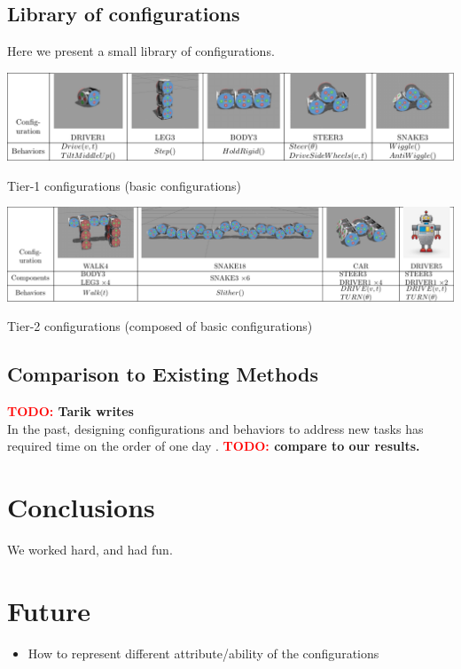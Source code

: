 \documentclass[conference]{IEEEtran}
\theoremstyle{definition}
\newcommand{\TODO}[1]{ {\bf \textcolor{red}{TODO:} #1 }}
\begin{document}
\subsection{Library of configurations}
Here we present a small library of configurations.
\begin{table}
    \begin{center}
        \includegraphics{images/library/tier1.pdf}
        \caption{Tier-1 configurations (basic configurations)}
    \end{center}
\end{table}
\begin{table}
    \begin{center}
        \includegraphics{images/library/tier2.pdf}
        \caption{Tier-2 configurations (composed of basic configurations)}
    \end{center}
\end{table}

\subsection{Comparison to Existing Methods}
\TODO{Tarik writes}\\
In the past, designing configurations and behaviors to address new tasks has required
time on the order of one day \cite{sastra2011using}. \TODO{compare to our results.}

\section{Conclusions}
We worked hard, and had fun.

\section{Future}
\begin{itemize}
\item How to represent different attribute/ability of the configurations
\end{itemize}







\end{document}
